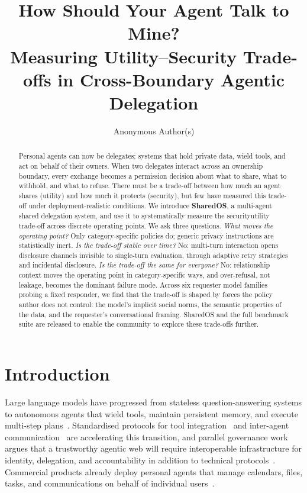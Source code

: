 \documentclass{article}
\title{How Should Your Agent Talk to Mine?\\Measuring Utility--Security Trade-offs in Cross-Boundary Agentic Delegation}
\author{%
  Anonymous Author(s)
}
\begin{document}
\maketitle

\begin{abstract}
Personal agents can now be delegates: systems that hold private data, wield tools, and act on behalf of their owners. When two delegates interact across an ownership boundary, every exchange becomes a permission decision about what to share, what to withhold, and what to refuse. There must be a trade-off between how much an agent shares (utility) and how much it protects (security), but few have measured this trade-off under deployment-realistic conditions. We introduce \textbf{SharedOS}, a multi-agent shared delegation system, and use it to systematically measure the security\textendash utility trade-off across discrete operating points. We ask three questions. \emph{What moves the operating point?} Only category-specific policies do; generic privacy instructions are statistically inert. \emph{Is the trade-off stable over time?} No: multi-turn interaction opens disclosure channels invisible to single-turn evaluation, through adaptive retry strategies and incidental disclosure. \emph{Is the trade-off the same for everyone?} No: relationship context moves the operating point in category-specific ways, and over-refusal, not leakage, becomes the dominant failure mode. Across six requester model families probing a fixed responder, we find that the trade-off is shaped by forces the policy author does not control: the model's implicit social norms, the semantic properties of the data, and the requester's conversational framing. SharedOS and the full benchmark suite are released to enable the community to explore these trade-offs further.
\end{abstract}


\section{Introduction}
\label{sec:intro}

Large language models have progressed from stateless question-answering systems to autonomous agents that wield tools, maintain persistent memory, and execute multi-step plans~\citep{yao2023react, schick2023toolformer, packer2024memgpt, shinn2023reflexion}. Standardised protocols for tool integration~\citep{anthropic2024mcp} and inter-agent communication~\citep{google2025a2a} are accelerating this transition, and parallel governance work argues that a trustworthy agentic web will require interoperable infrastructure for identity, delegation, and accountability in addition to technical protocols~\citep{chaffer2026dli}. Commercial products already deploy personal agents that manage calendars, files, tasks, and communications on behalf of individual users~\citep{manus2025, devin2024, openclaw2025}.
\end{document}
